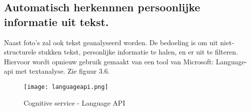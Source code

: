 \subsection{Automatisch herkennnen persoonlijke informatie uit tekst.}

Naast foto's zal ook tekst geanalyseerd worden. De bedoeling is om uit niet-structurele stukken tekst, personlijke informatie te halen, en er uit te filteren. 
Hiervoor wordt opnieuw gebruik gemaakt van een tool van Microsoft: Language-api met textanalyse. Zie figuur 3.6. 

\begin{figure}[h]
    \texttt{[image: languageapi.png]}
    \caption{Cognitive service - Language API }
    \label{fig:language api}
\end{figure}